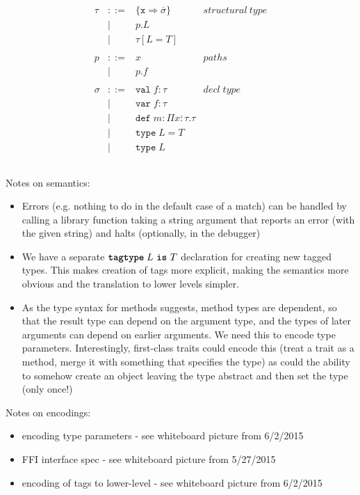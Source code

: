 \documentclass{article}
\newcommand{\keyw}[1]{\texttt{\textbf{#1}}}
\begin{document}
\[\begin{array}{lll}
\begin{array}{lllr}
&&\\
\tau & ::= & \{\texttt{x} \Rightarrow \overline{\sigma}\} & structural~type \\
& | & p.L &\\
& | & \tau[L=T] &\\
&&\\
p & ::= & x & paths \\
& | & p.f &\\
&&\\
\sigma & ::= & \texttt{val} \; f:\tau & decl \; type\\
       & |   & \texttt{var} \; f:\tau \\
       & |   & \texttt{def} \; m:\Pi \overline{x{:}\tau} . \tau \\
       & |   & \texttt{type} \; L = T &\\
       & |   & \texttt{type} \; L &\\
&&\\
\end{array}
\end{array}
\]

Notes on semantics:

\begin{itemize}

\item Errors (e.g. nothing to do in the default case of a match) can be handled by calling a library function taking a string argument that reports an error (with the given string) and halts (optionally, in the debugger)

\item We have a separate $\keyw{tagtype} \; L~\keyw{is}~T$ declaration for creating new tagged types.  This makes creation of tags more explicit, making the semantics more obvious and the translation to lower levels simpler.

\item As the type syntax for methods suggests, method types are dependent, so that the result type can depend on the argument type, and the types of later arguments can depend on earlier arguments.  We need this to encode type parameters.  Interestingly, first-class traits could encode this (treat a trait as a method, merge it with something that specifies the type) as could the ability to somehow create an object leaving the type abstract and then set the type (only once!)

\end{itemize}

Notes on encodings:

\begin{itemize}

\item encoding type parameters - see whiteboard picture from 6/2/2015

\item FFI interface spec - see whiteboard picture from 5/27/2015

\item encoding of tags to lower-level - see whiteboard picture from 6/2/2015

\end{itemize}




\end{document}
